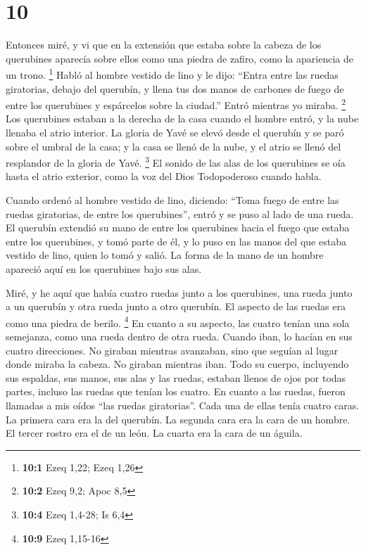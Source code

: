 \hypertarget{section-9}{%
\section{10}\label{section-9}}

 Entonces miré, y vi que en la extensión que estaba sobre
la cabeza de los querubines aparecía sobre ellos como una piedra de
zafiro, como la apariencia de un trono. \footnote{\textbf{10:1} Ezeq
  1,22; Ezeq 1,26}  Habló al hombre vestido de lino y le
dijo: ``Entra entre las ruedas giratorias, debajo del querubín, y llena
tus dos manos de carbones de fuego de entre los querubines y espárcelos
sobre la ciudad.'' Entró mientras yo miraba. \footnote{\textbf{10:2}
  Ezeq 9,2; Apoc 8,5}  Los querubines estaban a la derecha
de la casa cuando el hombre entró, y la nube llenaba el atrio interior.
 La gloria de Yavé se elevó desde el querubín y se paró
sobre el umbral de la casa; y la casa se llenó de la nube, y el atrio se
llenó del resplandor de la gloria de Yavé. \footnote{\textbf{10:4} Ezeq
  1,4-28; Is 6,4}  El sonido de las alas de los querubines
se oía hasta el atrio exterior, como la voz del Dios Todopoderoso cuando
habla.

 Cuando ordenó al hombre vestido de lino, diciendo: ``Toma
fuego de entre las ruedas giratorias, de entre los querubines'', entró y
se puso al lado de una rueda.  El querubín extendió su
mano de entre los querubines hacia el fuego que estaba entre los
querubines, y tomó parte de él, y lo puso en las manos del que estaba
vestido de lino, quien lo tomó y salió.  La forma de la
mano de un hombre apareció aquí en los querubines bajo sus alas.

 Miré, y he aquí que había cuatro ruedas junto a los
querubines, una rueda junto a un querubín y otra rueda junto a otro
querubín. El aspecto de las ruedas era como una piedra de berilo.
\footnote{\textbf{10:9} Ezeq 1,15-16}  En cuanto a su
aspecto, las cuatro tenían una sola semejanza, como una rueda dentro de
otra rueda.  Cuando iban, lo hacían en sus cuatro
direcciones. No giraban mientras avanzaban, sino que seguían al lugar
donde miraba la cabeza. No giraban mientras iban.  Todo
su cuerpo, incluyendo sus espaldas, sus manos, sus alas y las ruedas,
estaban llenos de ojos por todas partes, incluso las ruedas que tenían
los cuatro.  En cuanto a las ruedas, fueron llamadas a
mis oídos ``las ruedas giratorias''.  Cada una de ellas
tenía cuatro caras. La primera cara era la del querubín. La segunda cara
era la cara de un hombre. El tercer rostro era el de un león. La cuarta
era la cara de un águila.

